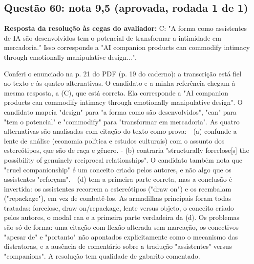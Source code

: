 \documentclass{article}%
\begin{document}
\subsection*{Questão 60: nota 9,5 (aprovada, rodada 1 de 1)}%
\textbf{Resposta da resolução às cegas do avaliador:} C: "A forma como assistentes de IA são desenvolvidos tem o potencial de transformar a intimidade em mercadoria." Isso corresponde a "AI companion products can commodify intimacy through emotionally manipulative design...".\par %
Conferi o enunciado na p. 21 do PDF (p. 19 do caderno): a transcrição está fiel ao texto e às quatro alternativas. O candidato e a minha referência chegam à mesma resposta, a (C), que está correta. Ela corresponde a "AI companion products can commodify intimacy through emotionally manipulative design". O candidato mapeia "design" para "a forma como são desenvolvidos", "can" para "tem o potencial" e "commodify" para "transformar em mercadoria".\newline%
\newline%
As quatro alternativas são analisadas com citação do texto como prova:\newline%
{-} (a) confunde a lente de análise (economia política e estudos culturais) com o assunto dos estereótipos, que são de raça e gênero.\newline%
{-} (b) contraria "structurally foreclose{[}s{]} the possibility of genuinely reciprocal relationships". O candidato também nota que "cruel companionship" é um conceito criado pelos autores, e não algo que os assistentes "reforçam".\newline%
{-} (d) tem a primeira parte correta, mas a conclusão é invertida: os assistentes recorrem a estereótipos ("draw on") e os reembalam ("repackage"), em vez de combatê{-}los.\newline%
\newline%
As armadilhas principais foram todas tratadas: foreclose, draw on/repackage, lente versus objeto, o conceito criado pelos autores, o modal can e a primeira parte verdadeira da (d). Os problemas são só de forma: uma citação com flexão alterada sem marcação, os conectivos "apesar de" e "portanto" não apontados explicitamente como o mecanismo das distratoras, e a ausência de comentário sobre a tradução "assistentes" versus "companions". A resolução tem qualidade de gabarito comentado.%
\end{document}
